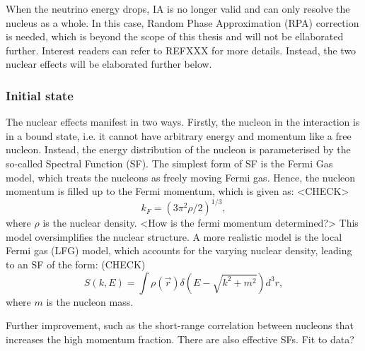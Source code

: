   When the neutrino energy drops, IA is no longer valid and can only resolve the nucleus as a whole.
  In this case, Random Phase Approximation (RPA) correction is needed, which is beyond the scope of this thesis and will not be ellaborated further. 
  Interest readers can refer to REFXXX for more details.
  Instead, the two nuclear effects will be elaborated further below.

    \subsubsection{Initial state}
    The nuclear effects manifest in two ways.
    Firstly, the nucleon in the interaction is in a bound state, i.e. it cannot have arbitrary energy and momentum like a free nucleon.
    Instead, the energy distribution of the nucleon is parameterised by the so-called Spectral Function (SF).
    The simplest form of SF is the Fermi Gas model, which treats the nucleons as freely moving Fermi gas.
    Hence, the nucleon momentum is filled up to the Fermi momentum, which is given as:
    <CHECK>
    \begin{equation}
        k_F = (3\pi^2 \rho/2)^{1/3},
    \end{equation}
    where $\rho$ is the nuclear density.
    <How is the fermi momentum determined?>
    This model oversimplifies the nuclear structure.
    A more realistic model is the local Fermi gas (LFG) model, which accounts for the varying nuclear density, leading to an SF of the form:
    (CHECK)
    \begin{equation}
        S(k, E) = \int \rho(\vec{r}) \delta(E - \sqrt{k^2 + m^2}) d^3r,
    \end{equation}
    where $m$ is the nucleon mass.

    Further improvement, such as the short-range correlation between nucleons that increases the high momentum fraction.
    There are also effective SFs. Fit to data?

